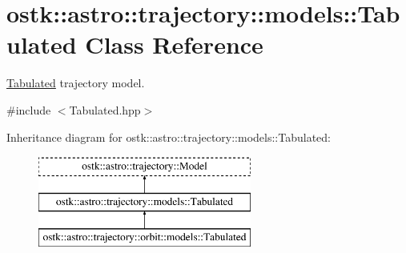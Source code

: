 \hypertarget{classostk_1_1astro_1_1trajectory_1_1models_1_1_tabulated}{}\section{ostk\+:\+:astro\+:\+:trajectory\+:\+:models\+:\+:Tabulated Class Reference}
\label{classostk_1_1astro_1_1trajectory_1_1models_1_1_tabulated}


\hyperlink{classostk_1_1astro_1_1trajectory_1_1models_1_1_tabulated}{Tabulated} trajectory model.  




{\ttfamily \#include $<$Tabulated.\+hpp$>$}

Inheritance diagram for ostk\+:\+:astro\+:\+:trajectory\+:\+:models\+:\+:Tabulated\+:\begin{figure}[H]
\begin{center}
\leavevmode
\includegraphics[height=3.000000cm]{classostk_1_1astro_1_1trajectory_1_1models_1_1_tabulated}
\end{center}
\end{figure}
